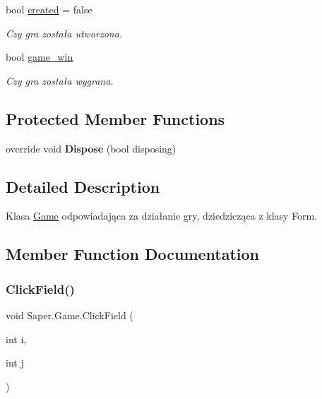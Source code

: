\begin{DoxyCompactItemize}
\mbox{\label{class_saper_1_1_game_adc5efafe49ceab9315e68c8077db0800}} 
bool \mbox{\hyperlink{class_saper_1_1_game_adc5efafe49ceab9315e68c8077db0800}{created}} = false
\begin{DoxyCompactList}\small\item\em Czy gra została utworzona. \end{DoxyCompactList}\item 
\mbox{\label{class_saper_1_1_game_a9cfb62bd4e52323d17b9a4f4b58f8a4f}} 
bool \mbox{\hyperlink{class_saper_1_1_game_a9cfb62bd4e52323d17b9a4f4b58f8a4f}{game\+\_\+win}}
\begin{DoxyCompactList}\small\item\em Czy gra została wygrana. \end{DoxyCompactList}\end{DoxyCompactItemize}
\subsection*{Protected Member Functions}
\begin{DoxyCompactItemize}
\item 
\mbox{\label{class_saper_1_1_game_af10b28306097f647aea5dbc84196fcd1}} 
override void {\bfseries Dispose} (bool disposing)
\end{DoxyCompactItemize}


\subsection{Detailed Description}
Klasa \mbox{\hyperlink{class_saper_1_1_game}{Game}} odpowiadająca za działanie gry, dziedzicząca z klasy Form. 

\subsection{Member Function Documentation}
\mbox{\label{class_saper_1_1_game_a87c8f7562e380781913a182aab6e093d}} 
\subsubsection{\texorpdfstring{ClickField()}{ClickField()}}
{\footnotesize\ttfamily void Saper.\+Game.\+Click\+Field (\begin{DoxyParamCaption}\item[{int}]{i,  }\item[{int}]{j }\end{DoxyParamCaption})}

